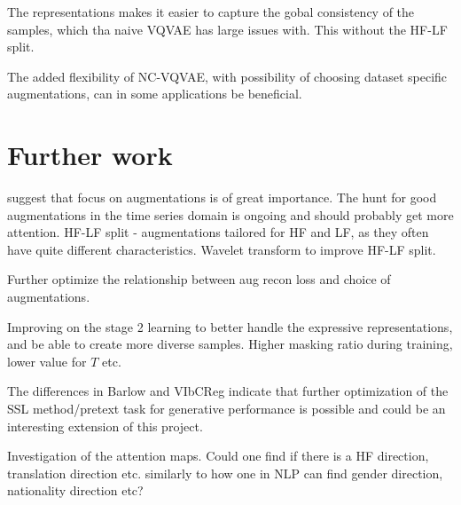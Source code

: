 \documentclass[../../thesis.tex]{subfiles}
\begin{document}
The representations makes it easier to capture the gobal consistency of the samples, which tha naive VQVAE has large issues with. This without the HF-LF split.

The added flexibility of NC-VQVAE, with possibility of choosing dataset specific augmentations, can in some applications be beneficial.\newline


\section{Further work}



\cite{morningstar2024augmentations} suggest that focus on augmentations is of great importance. The hunt for good augmentations in the time series domain is ongoing and should probably get more attention.\newline
HF-LF split - augmentations tailored for HF and LF, as they often have quite different characteristics.\newline
Wavelet transform to improve HF-LF split.\newline

Further optimize the relationship between aug recon loss and choice of augmentations.\newline

Improving on the stage 2 learning to better handle the expressive representations, and be able to create more diverse samples. Higher masking ratio during training, lower value for $T$ etc.\newline

The differences in Barlow and VIbCReg indicate that further optimization of the SSL method/pretext task for generative performance is possible and could be an interesting extension of this project. \newline

Investigation of the attention maps. Could one find if there is a HF direction, translation direction etc. similarly to how one in NLP can find gender direction, nationality direction etc?
\end{document}
